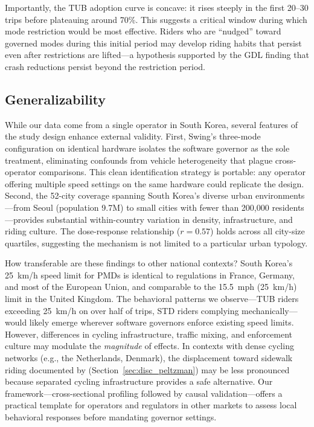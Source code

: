 Importantly, the TUB adoption curve is concave: it rises steeply in the first 20--30 trips before plateauing around 70\%. This suggests a critical window during which mode restriction would be most effective. Riders who are ``nudged'' toward governed modes during this initial period may develop riding habits that persist even after restrictions are lifted---a hypothesis supported by the GDL finding that crash reductions persist beyond the restriction period.

\subsection{Generalizability}
\label{sec:disc_generalizability}

While our data come from a single operator in South Korea, several features of the study design enhance external validity. First, Swing's three-mode configuration on identical hardware isolates the software governor as the sole treatment, eliminating confounds from vehicle heterogeneity that plague cross-operator comparisons. This clean identification strategy is portable: any operator offering multiple speed settings on the same hardware could replicate the design. Second, the 52-city coverage spanning South Korea's diverse urban environments---from Seoul (population 9.7M) to small cities with fewer than 200,000 residents---provides substantial within-country variation in density, infrastructure, and riding culture. The dose-response relationship ($r = 0.57$) holds across all city-size quartiles, suggesting the mechanism is not limited to a particular urban typology.

How transferable are these findings to other national contexts? South Korea's 25~km/h speed limit for PMDs is identical to regulations in France, Germany, and most of the European Union, and comparable to the 15.5~mph (25~km/h) limit in the United Kingdom. The behavioral patterns we observe---TUB riders exceeding 25~km/h on over half of trips, STD riders complying mechanically---would likely emerge wherever software governors enforce existing speed limits. However, differences in cycling infrastructure, traffic mixing, and enforcement culture may modulate the \textit{magnitude} of effects. In contexts with dense cycling networks (e.g., the Netherlands, Denmark), the displacement toward sidewalk riding documented by \citet{cicchino2023speed} (Section~\ref{sec:disc_peltzman}) may be less pronounced because separated cycling infrastructure provides a safe alternative. Our framework---cross-sectional profiling followed by causal validation---offers a practical template for operators and regulators in other markets to assess local behavioral responses before mandating governor settings.

